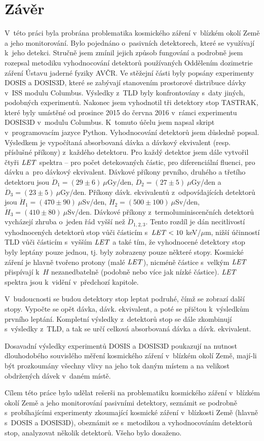 \chapter*{Závěr}%
\markboth{}{}
V~této práci byla probrána problematika kosmického záření v~blízkém okolí Země a jeho monitorování. Bylo pojednáno o~pasivních detektorech, které se využívají k~jeho detekci. Stručně jsem zmínil jejich způsob fungování a podrobně jsem rozepsal metodiku vyhodnocování detektorů používaných Oddělením dozimetrie záření Ústavu jaderné fyziky AVČR. Ve stěžejní části byly popsány experimenty DOSIS a DOSIS3D, které se zabývají stanovením prostorové distribuce dávky v~ISS modulu Columbus. Výsledky z~TLD byly konfrontovány s~daty jiných, podobných experimentů. Nakonec jsem vyhodnotil tři detektory stop TASTRAK, které byly umístěné od prosince 2015 do června 2016 v~rámci experimentu DOSIS3D v~modulu Columbus. K~tomuto účelu jsem napsal skript v~programovacím jazyce Python.
Vyhodnocování detektorů jsem důsledně popsal. Výsledkem je vypočítaná absorbovaná dávka a dávkový ekvivalent (resp. příslušné příkony) z~každého detektoru. Pro každý detektor
jsem dále vytvořil čtyři $\mathit{LET}$ spektra -- pro počet detekovaných částic, pro diferenciální fluenci, pro dávku a~pro dávkový ekvivalent. Dávkové příkony prvního, druhého a třetího detektoru jsou $\dot{D}_1=(29\pm6)\ \mu$Gy/den, $\dot{D}_2=(27\pm5)\ \mu$Gy/den a $\dot{D}_3=(23\pm5)\ \mu$Gy/den. Příkony dávk. ekvivalentů z~odpovídajících detektorů jsou $\dot{H}_1=(470\pm90)\ \mu$Sv/den, $\dot{H}_2=(500\pm100)\ \mu$Sv/den, $\dot{H}_3=(410\pm80)\ \mu$Sv/den. Dávkové příkony z~termoluminiscenčních detektorů vycházejí zhruba o~jeden řád vyšší než $\dot{D}_{1,2,3}$. Tento rozdíl je dán necitlivostí vyhodnocených detektorů stop vůči částicím s~$\mathit{LET}<10$ keV/$\mu$m, nižší účinností TLD vůči částicím s~vyšším $\mathit{LET}$ a také tím, že vyhodnocené detektory stop byly leptány pouze jednou, tj. byly zobrazeny pouze některé stopy. Kosmické záření je
hlavně tvořeno protony (malé $\mathit{LET}$), nicméně částice s~velkým $\mathit{LET}$ přispívají k~$H$ nezanedbatelně (podobně nebo více jak nízké částice). $\mathit{LET}$ spektra jsou k~vidění v~předchozí kapitole.

V~budoucnosti se budou detektory stop leptat podruhé, čímž se zobrazí další stopy. Vypočte se opět dávka, dávk. ekvivalent, a poté se přičtou k~výsledkům prvního leptání. Kompletní výsledky z~detektorů stop se dále zkombinují s~výsledky z~TLD, a tak se určí celková absorbovaná dávka a dávk. ekvivalent. 

Dosavadní výsledky experimentů DOSIS a DOSIS3D poukazují na nutnost dlouhodobého souvislého měření kosmického záření v~blízkém okolí Země, mají-li být prozkoumány všechny vlivy na jeho tok daným místem a na velikost obdržených dávek v~daném místě.

Cílem této práce bylo udělat rešerši na problematiku kosmického záření v~blízkém okolí Země a jeho monitorování pasivními detektory, seznámit se podrobně s~probíhajícími experimenty zkoumající kosmické záření v~blízkosti Země (hlavně s~DOSIS a DOSIS3D), obeznámit se s~metodikou a vyhodnocováním detektorů stop, analyzovat několik detektorů. Všeho bylo dosaženo. 
